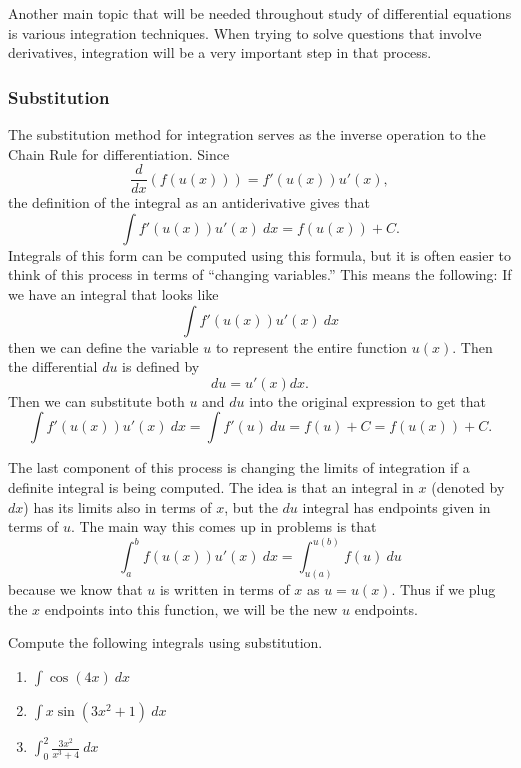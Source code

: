Another main topic that will be needed throughout study of differential equations is various integration techniques. When trying to solve questions that involve derivatives, integration will be a very important step in that process.

\subsubsection{Substitution}

The substitution method for integration serves as the inverse operation to the Chain Rule for differentiation. Since \[ \frac{d}{dx}(f(u(x))) = f'(u(x))u'(x), \] the definition of the integral as an antiderivative gives that
\[ \int f'(u(x))u'(x)\ dx = f(u(x)) + C.\] Integrals of this form can be computed using this formula, but it is often easier to think of this process in terms of ``changing variables.'' This means the following: If we have an integral that looks like 
\[ \int f'(u(x))u'(x)\ dx \] then we can define the variable $u$ to represent the entire function $u(x)$. Then the differential $du$ is defined by 
\[ du = u'(x) dx. \] Then we can substitute both $u$ and $du$ into the original expression to get that 
\[ \int f'(u(x))u'(x)\ dx = \int f'(u)\ du = f(u) + C = f(u(x)) + C. \]

The last component of this process is changing the limits of integration if a definite integral is being computed. The idea is that an integral in $x$ (denoted by $dx$) has its limits also in terms of $x$, but the $du$ integral has endpoints given in terms of $u$. The main way this comes up in problems is that
\[ \int_a^b f(u(x))u'(x)\ dx = \int_{u(a)}^{u(b)} f(u)\ du \] because we know that $u$ is written in terms of $x$ as $u = u(x)$. Thus if we plug the $x$ endpoints into this function, we will be the new $u$ endpoints.

\begin{example}
Compute the following integrals using substitution.
\begin{enumerate}
\item $\displaystyle \int \cos(4x)\ dx$
\item $\displaystyle \int x\sin(3x^2 + 1)\ dx$
\item $\displaystyle \int_0^2 \frac{3x^2}{x^3 + 4}\ dx$ 
\end{enumerate}
\end{example}

